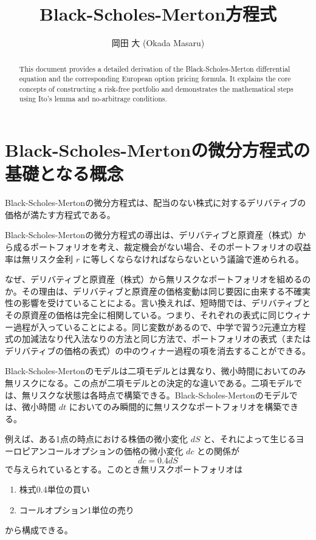 \documentclass[uplatex]{jsarticle}
\title{Black-Scholes-Merton方程式}
\author{
岡田 大 (Okada Masaru)
}
\begin{document}
\maketitle

\begin{abstract}
    This document provides a detailed derivation of the Black-Scholes-Merton differential equation and the corresponding European option pricing formula. It explains the core concepts of constructing a risk-free portfolio and demonstrates the mathematical steps using Ito's lemma and no-arbitrage conditions.
\end{abstract}

\section{Black-Scholes-Mertonの微分方程式の基礎となる概念}

Black-Scholes-Mertonの微分方程式は、配当のない株式に対するデリバティブの価格が満たす方程式である。

Black-Scholes-Mertonの微分方程式の導出は、デリバティブと原資産（株式）から成るポートフォリオを考え、裁定機会がない場合、そのポートフォリオの収益率は無リスク金利 $r$ に等しくならなければならないという議論で進められる。

なぜ、デリバティブと原資産（株式）から無リスクなポートフォリオを組めるのか。その理由は、デリバティブと原資産の価格変動は同じ要因に由来する不確実性の影響を受けていることによる。言い換えれば、短時間では、デリバティブとその原資産の価格は完全に相関している。つまり、それぞれの表式に同じウィナー過程が入っていることによる。同じ変数があるので、中学で習う2元連立方程式の加減法なり代入法なりの方法と同じ方法で、ポートフォリオの表式（またはデリバティブの価格の表式）の中のウィナー過程の項を消去することができる。

Black-Scholes-Mertonのモデルは二項モデルとは異なり、微小時間においてのみ無リスクになる。この点が二項モデルとの決定的な違いである。二項モデルでは、無リスクな状態は各時点で構築できる。Black-Scholes-Mertonのモデルでは、微小時間 $dt$ においてのみ瞬間的に無リスクなポートフォリオを構築できる。

\bigskip

例えば、ある1点の時点における株価の微小変化 $dS$ と、それによって生じるヨーロピアンコールオプションの価格の微小変化 $dc$ との関係が
$$
	dc = 0.4 dS
$$
で与えられているとする。このとき無リスクポートフォリオは
\begin{enumerate}
	\item 株式0.4単位の買い
	\item コールオプション1単位の売り
\end{enumerate}
から構成できる。
\end{document}
